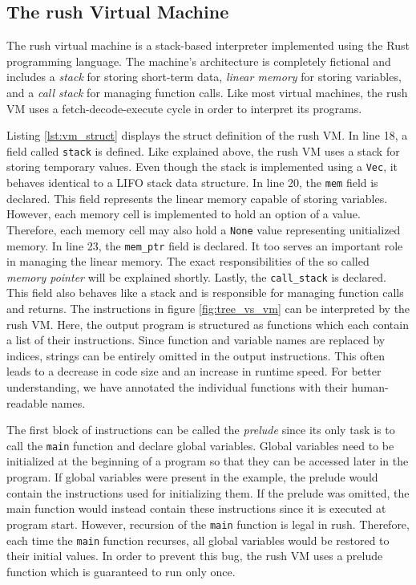 \subsection{The rush Virtual Machine}

The rush virtual machine is a stack-based interpreter implemented using the Rust programming language.
The machine's architecture is completely fictional and includes a \emph{stack} for storing short-term data, \emph{linear memory} for storing variables, and a \emph{call stack} for managing function calls.
Like most virtual machines, the rush VM uses a fetch-decode-execute cycle in order to interpret its programs.


Listing \ref{lst:vm_struct} displays the struct definition of the rush VM.
In line 18, a field called \texttt{stack} is defined.
Like explained above, the rush VM uses a stack for storing temporary values.
Even though the stack is implemented using a \texttt{Vec}, it behaves identical to a LIFO stack data structure.
In line 20, the \texttt{mem} field is declared.
This field represents the linear memory capable of storing variables.
However, each memory cell is implemented to hold an option of a value.
Therefore, each memory cell may also hold a \texttt{None} value representing unitialized memory.
In line 23, the \texttt{mem\_ptr} field is declared.
It too serves an important role in managing the linear memory.
The exact responsibilities of the so called \emph{memory pointer} will be explained shortly.
Lastly, the \texttt{call\_stack} is declared.
This field also behaves like a stack and is responsible for managing function calls and returns.
The instructions in figure \ref{fig:tree_vs_vm} can be interpreted by the rush VM.
Here, the output program is structured as functions which each contain a list of their instructions.
Since function and variable names are replaced by indices, strings can be entirely omitted in the output instructions.
This often leads to a decrease in code size and an increase in runtime speed.
For better understanding, we have annotated the individual functions with their human-readable names.

The first block of instructions can be called the \emph{prelude} since its only task is to call the \texttt{main} function and declare global variables.
Global variables need to be initialized at the beginning of a program so that they can be accessed later in the program.
If global variables were present in the example, the prelude would contain the instructions used for initializing them.
If the prelude was omitted, the main function would instead contain these instructions since it is executed at program start.
However, recursion of the \texttt{main} function is legal in rush.
Therefore, each time the \texttt{main} function recurses, all global variables would be restored to their initial values.
In order to prevent this bug, the rush VM uses a prelude function which is guaranteed to run only once.


